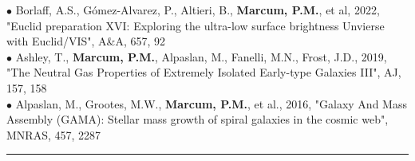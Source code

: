 {\scriptsize{$\bullet$}} Borlaff, A.S., G{\'o}mez-Alvarez, P., Altieri, B., \textbf{Marcum, P.M.}, et al, 2022, "Euclid preparation XVI: Exploring the ultra-low surface brightness Unvierse with Euclid/VIS", A\&A, 657, 92\\
{\scriptsize{$\bullet$}} Ashley, T., \textbf{Marcum, P.M.}, Alpaslan, M., Fanelli, M.N., Frost, J.D., 2019, "The Neutral Gas Properties of Extremely Isolated Early-type Galaxies III", AJ, 157, 158\\
{\scriptsize{$\bullet$}} Alpaslan, M., Grootes, M.W., \textbf{Marcum, P.M.}, et al., 2016, "Galaxy And Mass Assembly (GAMA): Stellar mass growth of spiral galaxies in the cosmic web", MNRAS, 457, 2287\\
\medskip \hrule \vspace{5pt} \medskip